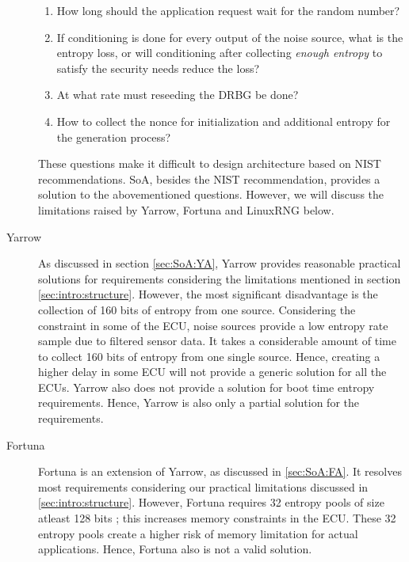 \begin{description}
\begin{enumerate}
		\item How long should the application request wait for the random number?
				
		\item If conditioning is done for every output of the noise source,
		what is the entropy loss, or will conditioning after collecting \textit{enough entropy} to satisfy the security needs reduce the loss?
		
		\item At what rate must reseeding the DRBG be done?
		
		\item How to collect the nonce for initialization and additional
		entropy for the generation process?
	\end{enumerate} 

	These questions make it difficult to design architecture 
	based on NIST recommendations. SoA, besides the NIST recommendation, provides a solution to the abovementioned questions. However, we will discuss the limitations raised by Yarrow, Fortuna and LinuxRNG below.
	
	\item[Yarrow] As discussed in section \ref{sec:SoA:YA}, Yarrow provides reasonable practical solutions for requirements considering the limitations mentioned in section \ref{sec:intro:structure}. However, the most significant disadvantage is the collection of 160 bits of entropy from one source. Considering the constraint in some of the ECU, noise sources provide a low entropy rate sample due to filtered sensor data. It takes a considerable amount of time to collect 160 bits of entropy from one single source. Hence, creating a higher delay in some ECU will not provide a generic solution for all the ECUs. Yarrow also does not provide a solution for boot time entropy requirements. Hence, Yarrow is also only a partial solution for the requirements.
	
	\item[Fortuna] Fortuna is an extension of Yarrow, as discussed in \ref{sec:SoA:FA}. It resolves most requirements considering our practical limitations discussed in \ref{sec:intro:structure}. However, Fortuna requires 32 entropy pools of size atleast 128 bits \cite{FT-2011}; this increases memory constraints in the ECU. These 32 entropy pools create a higher risk of memory limitation for actual applications. Hence, Fortuna also is not a valid solution.
	

\end{description}
